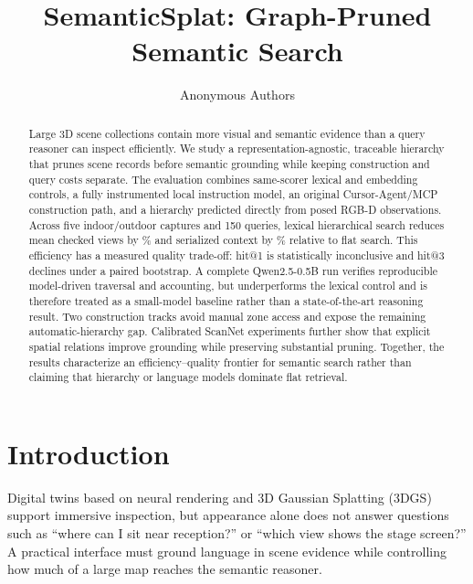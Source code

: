 \documentclass[runningheads]{llncs}
\title{SemanticSplat: Graph-Pruned Semantic Search}
\author{Anonymous Authors}
\institute{Anonymous Institution}
\begin{document}
\raggedbottom
\maketitle

\begin{abstract}
Large 3D scene collections contain more visual and semantic evidence than a
query reasoner can inspect efficiently. We study a representation-agnostic,
traceable hierarchy that prunes scene records before semantic grounding while
keeping construction and query costs separate. The evaluation combines
same-scorer lexical and embedding controls, a fully instrumented local
instruction model, an original Cursor-Agent/MCP construction path, and a
hierarchy predicted directly from posed RGB-D observations. Across five
indoor/outdoor captures and 150 queries, lexical hierarchical search reduces
mean checked views by \ViewSavingsPerQuery{}\% and serialized context by
\TokenSavingsPerQuery{}\% relative to flat search. This efficiency has a
measured quality trade-off: hit@1 is statistically inconclusive and hit@3
declines under a paired bootstrap. A complete Qwen2.5-0.5B run verifies
reproducible model-driven traversal and accounting, but underperforms the
lexical control and is therefore treated as a small-model baseline rather than
a state-of-the-art reasoning result. Two construction tracks avoid manual zone
access and expose the remaining automatic-hierarchy gap. Calibrated ScanNet
experiments further show that explicit spatial relations improve grounding
while preserving substantial pruning. Together, the results characterize an
efficiency--quality frontier for semantic search rather than claiming that
hierarchy or language models dominate flat retrieval.
\end{abstract}

\section{Introduction}
Digital twins based on neural rendering and 3D Gaussian Splatting
(3DGS)~\cite{kerbl20233dgs} support immersive inspection, but appearance alone
does not answer questions such as ``where can I sit near reception?'' or
``which view shows the stage screen?'' A practical interface must ground
language in scene evidence while controlling how much of a large map reaches
the semantic reasoner.
\end{document}

